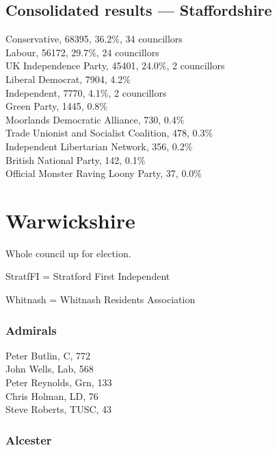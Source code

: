 \documentclass[a4paper,openany,10pt]{book}
\begin{document}
\subsection*{Consolidated results --- Staffordshire}
Conservative, 68395, 36.2\%, 34 councillors\\
Labour, 56172, 29.7\%, 24 councillors\\
UK Independence Party, 45401, 24.0\%, 2 councillors\\
Liberal Democrat, 7904, 4.2\% \\
Independent, 7770, 4.1\%, 2 councillors\\
Green Party, 1445, 0.8\% \\
Moorlands Democratic Alliance, 730, 0.4\% \\
Trade Unionist and Socialist Coalition, 478, 0.3\% \\
Independent Libertarian Network, 356, 0.2\% \\
British National Party, 142, 0.1\% \\
Official Monster Raving Loony Party, 37, 0.0\% \\


\vfill\eject

\section{Warwickshire}

Whole council up for election.

StratfFI = Stratford First Independent

Whitnash = Whitnash Residents Association



\subsubsection*{Admirals}



Peter Butlin, C, 772\\
John Wells, Lab, 568\\
Peter Reynolds, Grn, 133\\
Chris Holman, LD, 76\\
Steve Roberts, TUSC, 43\\


\subsubsection*{Alcester}
\end{document}
